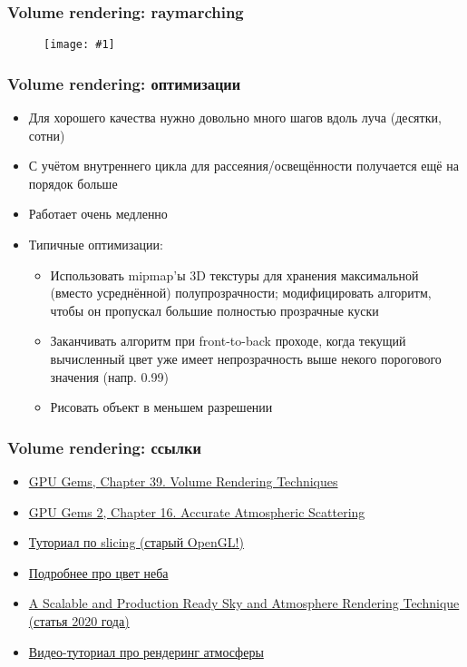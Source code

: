 \documentclass{beamer}
\newcommand{\slideimage}[1]{
  \begin{figure}
    \begin{adjustbox}{width=\textwidth, totalheight=\textheight-2\baselineskip-2\baselineskip,keepaspectratio}
      \texttt{[image: \#1]}
    \end{adjustbox}
  \end{figure}
}
\begin{document}
\begin{frame}[fragile]
\frametitle{Volume rendering: raymarching}
\slideimage{raymarching-2.png}
\end{frame}

\begin{frame}[fragile]
\frametitle{Volume rendering: оптимизации}
\begin{itemize}
\item Для хорошего качества нужно довольно много шагов вдоль луча (десятки, сотни)
\pause
\item С учётом внутреннего цикла для рассеяния/освещённости получается ещё на порядок больше
\pause
\item Работает очень медленно
\pause
\item Типичные оптимизации:
\begin{itemize}
\item Использовать mipmap'ы 3D текстуры для хранения максимальной (вместо усреднённой) полупрозрачности; модифицировать алгоритм, чтобы он пропускал большие полностью прозрачные куски
\pause
\item Заканчивать алгоритм при front-to-back проходе, когда текущий вычисленный цвет уже имеет непрозрачность выше некого порогового значения (напр. 0.99)
\pause
\item Рисовать объект в меньшем разрешении
\end{itemize}
\end{itemize}
\end{frame}

\begin{frame}[fragile]
\frametitle{Volume rendering: ссылки}
\begin{itemize}
\item \href{https://developer.nvidia.com/gpugems/gpugems/part-vi-beyond-triangles/chapter-39-volume-rendering-techniques}{GPU Gems, Chapter 39. Volume Rendering Techniques}
\item \href{https://developer.nvidia.com/gpugems/gpugems2/part-ii-shading-lighting-and-shadows/chapter-16-accurate-atmospheric-scattering}{GPU Gems 2, Chapter 16. Accurate Atmospheric Scattering}
\item \href{https://www.codeproject.com/Articles/352270/Getting-Started-with-Volume-Rendering-using-OpenGL}{Туториал по slicing (старый OpenGL!)}
\item \href{https://www.scratchapixel.com/lessons/procedural-generation-virtual-worlds/simulating-sky/simulating-colors-of-the-sky}{Подробнее про цвет неба}
\item \href{https://sebh.github.io/publications/egsr2020.pdf}{A Scalable and Production Ready Sky and Atmosphere Rendering Technique (статья 2020 года)}
\item \href{https://www.youtube.com/watch?v=DxfEbulyFcY}{Видео-туториал про рендеринг атмосферы}
\end{itemize}
\end{frame}
\end{document}
